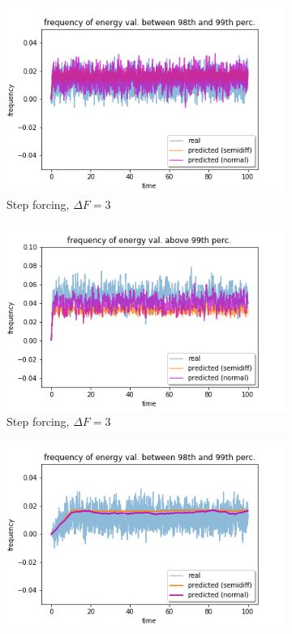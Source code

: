\documentclass{article}
\begin{document}
\begin{figure}[!h]
	\centering
	\begin{subfigure}[b]{0.48\textwidth}
		\includegraphics[width=1\linewidth]{fig/pred_energy_bin_098q_099q_S_30.png}
		\caption{Step forcing, $\Delta F=3$}
		\label{fig:pred_energy_bin_0.98q_0.99q_S_30}
	\end{subfigure}%
	\begin{subfigure}[b]{0.48\textwidth}
		\includegraphics[width=1\linewidth]{fig/pred_energy_exceed_099q_S_30.png}
		\caption{Step forcing, $\Delta F=3$}
		\label{fig:pred_energy_exceed_0.99q_S_30}
	\end{subfigure}
	\begin{subfigure}[b]{0.48\textwidth}
		\includegraphics[width=1\linewidth]{fig/pred_energy_bin_098q_099q_L_03_10.png}

\end{subfigure}
\end{figure}
\end{document}
